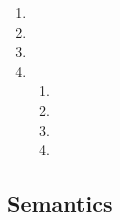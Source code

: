 \documentclass[a4paper,11pt]{article}
\begin{document}
\begin{enumerate}
\begin{enumerate}
\item %
\item %
\item %
\end{enumerate}

\item %

\item %

\item %

\item %
\begin{enumerate}
\item %
\item %
\item %
\item %
\end{enumerate}

\end{enumerate}


\subsection{Semantics}
\end{document}
